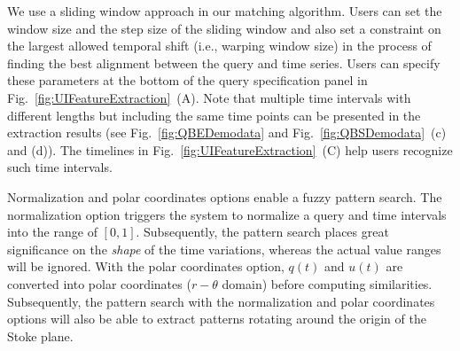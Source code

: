 We use a sliding window approach in our matching algorithm.
Users can set the window size and the step size of the sliding window and also set a constraint on the largest allowed temporal shift (i.e., warping window size)
in the process of finding the best alignment between the query and time series.
Users can specify these parameters at the bottom of the query specification panel in Fig.~\ref{fig:UIFeatureExtraction}~(A).
Note that multiple time intervals with different lengths but including the same time points can be presented in the extraction results (see Fig.~\ref{fig:QBEDemodata} and Fig.~\ref{fig:QBSDemodata}~(c) and (d)). %
The timelines in Fig.~\ref{fig:UIFeatureExtraction}~(C) help users recognize such time intervals. 

Normalization and polar coordinates options enable a fuzzy pattern search.
The normalization option triggers the system to normalize a query and time intervals into the range of $[0, 1]$.
Subsequently, the pattern search places great significance on the \emph{shape} of the time variations, whereas the actual value ranges will be ignored.
With the polar coordinates option, 
$q(t)$ and $u(t)$ are converted into polar coordinates ($r-\theta$ domain) before computing similarities.
Subsequently, the pattern search with the normalization and polar coordinates options will also be able to extract patterns rotating around the origin of the Stoke plane.

%
%
